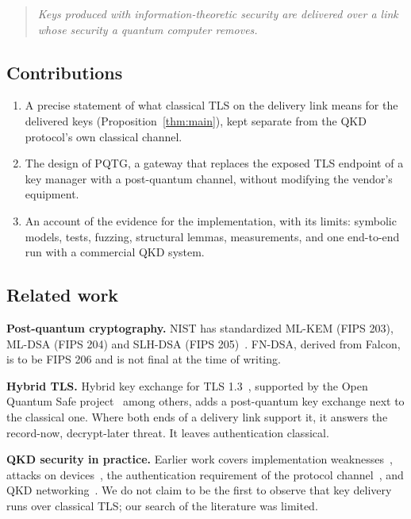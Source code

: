 \documentclass[11pt,letterpaper]{article}
\begin{document}
\begin{quote}
\textit{Keys produced with information-theoretic security are delivered over a link whose security a quantum computer removes.}
\end{quote}

\subsection{Contributions}

\begin{enumerate}
    \item A precise statement of what classical TLS on the delivery link means for the delivered keys (Proposition~\ref{thm:main}), kept separate from the QKD protocol's own classical channel.
    \item The design of PQTG, a gateway that replaces the exposed TLS endpoint of a key manager with a post-quantum channel, without modifying the vendor's equipment.
    \item An account of the evidence for the implementation, with its limits: symbolic models, tests, fuzzing, structural lemmas, measurements, and one end-to-end run with a commercial QKD system.
\end{enumerate}

\subsection{Related work}

\textbf{Post-quantum cryptography.} NIST has standardized ML-KEM (FIPS 203), ML-DSA (FIPS 204) and SLH-DSA (FIPS 205)~\cite{nist2024pqc}. FN-DSA, derived from Falcon, is to be FIPS 206 and is not final at the time of writing.

\textbf{Hybrid TLS.} Hybrid key exchange for TLS 1.3~\cite{stebila2023hybrid}, supported by the Open Quantum Safe project~\cite{stebila2016postquantum} among others, adds a post-quantum key exchange next to the classical one. Where both ends of a delivery link support it, it answers the record-now, decrypt-later threat. It leaves authentication classical.

\textbf{QKD security in practice.} Earlier work covers implementation weaknesses~\cite{xu2020secure}, attacks on devices~\cite{makarov2016creation}, the authentication requirement of the protocol channel~\cite{scarani2009security}, and QKD networking~\cite{mehic2020quantum}. We do not claim to be the first to observe that key delivery runs over classical TLS; our search of the literature was limited.
\end{document}
